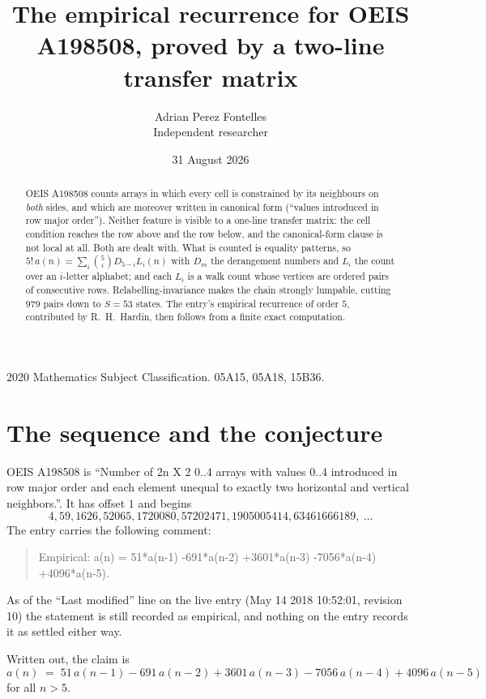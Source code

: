 \documentclass[11pt,a4paper]{article}
\title{The empirical recurrence for OEIS A198508, proved by a two-line transfer matrix}
\author{Adrian Perez Fontelles\\ \small Independent researcher}
\date{31 August 2026}
\theoremstyle{plain}
\theoremstyle{definition}
\begin{document}
\maketitle

\begin{abstract}
OEIS A198508 counts arrays in which every cell is constrained by its neighbours on \emph{both}
sides, and which are moreover written in canonical form (``values introduced in row major
order''). Neither feature is visible to a one-line transfer matrix: the cell condition
reaches the row above and the row below, and the canonical-form clause is not local at
all. Both are dealt with. What is counted is equality patterns, so
$5!\,a(n)=\sum_i\binom{5}{i}D_{5-i}L_i(n)$ with $D_m$ the derangement numbers and
$L_i$ the count over an $i$-letter alphabet; and each $L_i$ is a walk count whose vertices
are ordered pairs of consecutive rows. Relabelling-invariance makes the chain strongly
lumpable, cutting $979$ pairs down to $S=53$ states. The entry's empirical recurrence of
order $5$, contributed by R.~H.~Hardin, then follows from a finite exact computation.
\end{abstract}

\noindent\small 2020 Mathematics Subject Classification. 05A15, 05A18, 15B36.\normalsize

\section{The sequence and the conjecture}

OEIS A198508 is ``Number of 2n X 2 0..4 arrays with values 0..4 introduced in row major order and each element unequal to exactly two horizontal and vertical neighbors.''. It has offset $1$ and begins
\[
4, 59, 1626, 52065, 1720080, 57202471, 1905005414, 63461666189,\ \dots
\]
The entry carries the following comment:
\begin{quote}\small
Empirical: a(n) = 51*a(n-1) -691*a(n-2) +3601*a(n-3) -7056*a(n-4) +4096*a(n-5).
\end{quote}
As of the ``Last modified'' line on the live entry (May 14 2018 10:52:01, revision 10) the statement is
still recorded as empirical, and nothing on the entry records it as settled either way.

Written out, the claim is
\begin{equation}\label{eq:conj}
a(n)\;=\;51\,a(n-1) - 691\,a(n-2) + 3601\,a(n-3) - 7056\,a(n-4) + 4096\,a(n-5)
\end{equation}
for all $n>5$.
\end{document}
